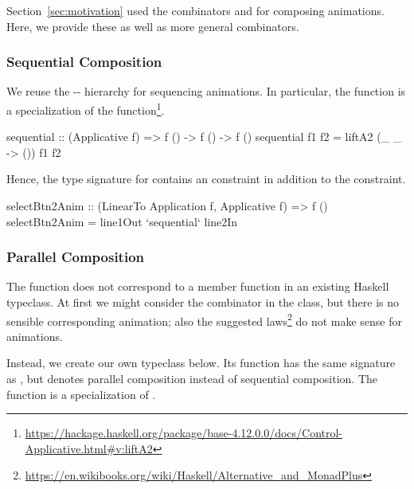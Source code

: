 Section~\ref{sec:motivation} used the combinators  and
 for composing animations. Here, we provide these as well as more
general combinators.



\subsubsection{Sequential Composition}

We reuse the -- hierarchy for
sequencing animations. In particular, the  function is a
specialization of the 
function\footnote{\url{https://hackage.haskell.org/package/base-4.12.0.0/docs/Control-Applicative.html\#v:liftA2}}.

\begin{code}
sequential :: (Applicative f) => f () -> f () -> f ()
sequential f1 f2 = liftA2 (\_ _ -> ()) f1 f2
\end{code}

Hence, the type signature for  contains an 
 constraint in addition to the 
constraint.

\begin{code}
selectBtn2Anim :: (LinearTo Application f, Applicative f) => f ()
selectBtn2Anim = line1Out `sequential` line2In
\end{code}

\subsubsection{Parallel Composition}

The  function does not correspond to a member function in an
existing Haskell typeclass. At first we might consider the \hs{<|>} combinator
in the  class, but there is no sensible corresponding
 animation; also the suggested 
laws\footnote{\url{https://en.wikibooks.org/wiki/Haskell/Alternative_and_MonadPlus}}
do not make sense for animations.

Instead, we create our own  typeclass below. Its function
 has the same signature as , but denotes
parallel composition instead of sequential composition. The
 function is a specialization of .

